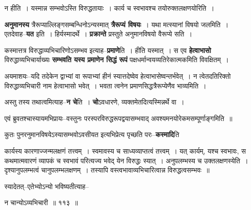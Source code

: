\documentclass[article,12pt,a4paper]{memoir}
\begin{document}
	  \endgroup
	 

	  \pstart न हीति । यस्मान्न सम्भवोऽस्ति विरुद्धतायाः । कार्य च स्वभावश्च तयोरुक्तलक्षणयोरिति ।
	\pend
      
	  \endgroup
	

	  \pstart \textbf{अनुमानस्य} त्रैरूप्याल्लिङ्गसम्बन्धिनोऽन्यस्मात् \textbf{त्रैरूप्यं विषयः} । यथा मत्स्यानां विषयो जलमिति । एतदेवाह--\textbf{यत} इति । हिर्यस्मादर्थे । \textbf{प्रक्रान्ते} प्रस्तुते अनुमानविषयो वैरूप्ये सति ।
	\pend
      

	  \pstart कस्मात्तत्र विरुद्धाव्यभिचारिणोऽसम्भव इत्याह--\textbf{प्रमाणे}ति । हीति यस्मात् । स एव \textbf{हेत्वाभासो} विरुद्धाव्यभिचार्याख्यः \textbf{सम्भवति यस्य प्रमाणेन सिद्धं रूपं} पक्षधर्मान्वयव्यतिरेकात्मकमिति विवक्षितम् ।
	\pend
      

	  \pstart अयमाशयः--यदि तदेकेन द्वाभ्यां वा रूपाभ्यां हीनं स्यात्तदेष्वेव हेत्वाभासेष्वन्तर्भवेत् । न त्वेतदतिरिक्तो विरुद्धाव्यभिचारी नाम हेत्वाभासो भवेत् । भवता त्वनेन प्रमाणसिद्धत्रैरूप्येणैव भाव्यमिति ।
	\pend
      

	  \pstart अस्तु तस्य तथात्वमित्याह--\textbf{न चे}ति । \textbf{चो}ऽवधारणे, व्यक्तमेतदित्यस्मिन्नर्थे वा ।
	\pend
      

	  \pstart एवं ब्रुवतश्चास्यायमभिप्रायः--वस्तुनः परस्परविरुद्धरूपद्वयासम्भवाद् अवश्यमनयोरेकमसम्पूर्णाङ्गमिति ॥
	\pend
      

	  \pstart कुतः पुनरनुमानविषयेऽस्यासम्भवोऽवसीयत इत्यभिप्रेत्य पृच्छति परः--\textbf{कस्मादि}ति  \leavevmode{} 
	  
	कार्यस्य कारणाज्जन्मलक्षणं तत्त्वम् । स्वमावस्य च साध्यव्याप्तत्वं तत्त्वम् । यत् कार्यम्, यश्च स्वभावः, स कथमात्मवारणं व्यापकं च स्वभावं परित्यज्य भवेद् येन विरुद्धः स्यात् । अनुपलम्भस्य च उक्तलक्षणस्येति । दृश्यानुपलम्भत्वं चानुपलम्भलक्षणम् । तस्यापि वस्त्वभावाव्यभिचारित्वान्न विरुद्धत्वसम्भवः ॥  
	  
	स्यादेतत्--एतेभ्योऽन्यो भविष्यतीत्याह--  
	  
	न चान्योऽव्यभिचारी ॥ ११३ ॥ 
	  
\end{document}
